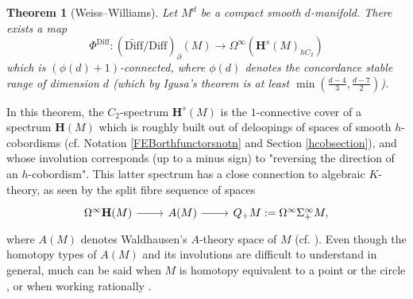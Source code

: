 \documentclass[a4paper, oneside]{amsart}
\newcommand{\diff}{\mathrm{Diff}}
\newcommand{\bdiff}{\widetilde{\mathrm{Diff}}}
\newcommand{\1}{\mathds{1}}
\newtheorem{thm}{Theorem}[section]%
\theoremstyle{remark}
\theoremstyle{definition}
\newcommand{\Hsp}{\mathbf{H}}
\numberwithin{equation}{section}
\begin{document}
\begin{thm}[Weiss--Williams]\label{WWbdiffmoddiff} Let $M^d$ be a compact smooth $d$-manifold. There exists a map
$$
\Phi^\diff: (\bdiff/\diff)_\partial(M)\longrightarrow \Omega^{\infty}\left(\Hsp^s(M)_{hC_2}\right)
$$
which is $(\phi(d)+1)$-connected, where $\phi(d)$ denotes the concordance stable range of dimension $d$ (which by Igusa's theorem \cite{IgusaConcordanceStability} is at least $\min(\frac{d-4}{3},\frac{d-7}{2})$).  
\end{thm}

In this theorem, the $C_2$-spectrum $\Hsp^s(M)$ is the $1$-connective cover of a spectrum $\Hsp(M)$ which is roughly built out of deloopings of spaces of smooth $h$-cobordisms (cf. Notation \ref{FEBorthfunctorsnotn} and Section \ref{hcobsection}), and whose involution corresponds (up to a minus sign) to "reversing the direction of an $h$-cobordism". This latter spectrum has a close connection to algebraic $K$-theory, as seen by the split fibre sequence of spaces \cite{WaldhausenParametrisedhcob}
\begin{equation}\label{WaldhausenWhFibseq}
\begin{tikzcd}
\Omega^\infty\Hsp(M)\rar & A(M)\rar & Q_+M:=\Omega^\infty\Sigma^\infty_+M,
\end{tikzcd}
\end{equation}
where $A(M)$ denotes Waldhausen's $A$-theory space of $M$ (cf. \cite{WaldhausenAtheory}). Even though the homotopy types of $A(M)$ and its involutions are difficult to understand in general, much can be said when $M$ is homotopy equivalent to a point \cite{Rognesprime2, RognesOddprimes, Blumberg2019} or the circle \cite{HesselholtWhiteheadS1}, or when working rationally \cite{BurgheleaFiedII}.
\end{document}
